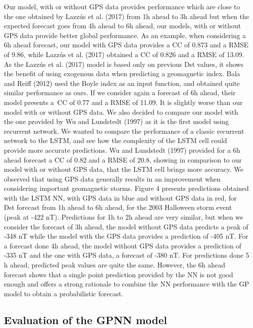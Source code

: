 Our model, with or without GPS data provides performance which are close to the one obtained by 
Lazzús et al. (2017) from 1h ahead to 3h ahead but when the expected forecast goes from 4h ahead to 6h ahead, 
our models, with or without GPS data provide better global performance. As an example, when considering a 6h 
ahead forecast, our model with GPS data provides a CC of 0.873 and a RMSE of 9.86, while Lazzús et al. (2017) 
obtained a CC of 0.826 and a RMSE of 13.09. As the Lazzús et al. (2017) model is based only on previous Dst values, 
it shows the benefit of using exogenous data when predicting a geomagnetic index. Bala and Reiff (2012) used 
the Boyle index as an input function, and obtained quite similar performance as ours. If we consider 
again a forecast of 6h ahead, their model presents a\ CC of 0.77 and a RMSE of 11.09. It is slightly  
worse than our model with or without GPS data. We also decided to compare our model with the one provided 
by Wu and Lundstedt (1997) as it is the first model using recurrent network. We wanted to compare the performance 
of a classic recurrent network to the LSTM, and see how the complexity of the LSTM cell could provide more 
accurate predictions. Wu and Lundstedt (1997) provided for a 6h ahead forecast a CC of 0.82 and a RMSE of 20.8, 
showing in comparison to our model with or without GPS data, that the LSTM cell brings more accuracy. We observed 
that using GPS data generally results in an improvement when considering important geomagnetic storms. 
Figure 4 presents predictions obtained with the LSTM NN, with GPS data in blue and without GPS data in red, 
for Dst forecast from 1h ahead to 6h ahead, for the 2003 Halloween storm event (peak at -422 nT). 
Predictions for 1h to 2h ahead are very similar, but when we consider the forecast of 3h ahead, the model 
without GPS data predicts a peak of -348 nT while the model with the GPS data provides a prediction of -405 nT. 
For a forecast done 4h ahead, the model without GPS data provides a prediction of -335 nT and the one with GPS data, 
a forecast of -380 nT. For predictions done 5 h ahead, predicted peak values are quite the same. 
However, the 6h ahead forecast shows that a single point prediction provided by the NN is not good enough and 
offers a strong rationale to combine the NN performance with the GP model to obtain a probabilistic forecast. 


\subsection{Evaluation of the GPNN model}

